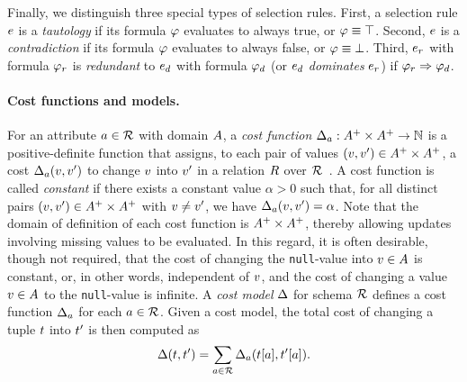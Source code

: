 Finally, we distinguish three special types of selection rules.
First, a selection rule $e$ is a \emph{tautology} if its formula $\varphi$ evaluates to always true, or $\varphi \equiv \top$.
Second, $e$ is a \emph{contradiction} if its formula $\varphi$ evaluates to always false, or $\varphi \equiv \bot$.
Third, $e_r$ with formula $\varphi_{r}$ is \emph{redundant} to $e_d$ with formula $\varphi_{d}$ (or $e_d$ \emph{dominates} $e_r$) if $\varphi_r \Rightarrow \varphi_d$.


\paragraph{Cost functions and models.}
For an attribute $a \in \mathcal{R}$ with domain $A$, a \emph{cost function} $\Delta_{a} : A^+ \times A^+ \rightarrow \mathbb{N}$ is a positive-definite function that assigns, to each pair of values $(v, v') \in A^+ \times A^+$, a cost $\Delta_{a}(v,v')$ to change $v$ into $v'$ in a relation $R$ over $\mathcal{R}$~\cite{Bronselaer2023}.
A cost function is called \emph{constant} if there exists a constant value $\alpha > 0$ such that, for all distinct pairs $(v, v') \in A^+ \times A^+$ with $v \neq v'$, we have $\Delta_{a}(v,v') = \alpha$.
Note that the domain of definition of each cost function is $A^+ \times A^+$, thereby allowing updates involving missing values to be evaluated.
In this regard, it is often desirable, though not required, that the cost of changing the \texttt{null}-value into $v \in A$ is constant, or, in other words, independent of $v$, and the cost of changing a value $v \in A$ to the \texttt{null}-value is infinite.
A \emph{cost model} $\Delta$ for schema $\mathcal{R}$ defines a cost function $\Delta_{a}$ for each $a \in \mathcal{R}$.
Given a cost model, the total cost of changing a tuple $t$ into $t'$ is then computed as
\begin{equation}
    \label{eq:costmodel}
    \Delta(t,t') = \sum_{a \in \mathcal{R}} \Delta_{a}(t[a],t'[a]).
\end{equation}